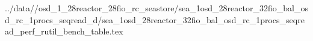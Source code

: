 ../data//osd_1_28reactor_28fio_rc_seastore/sea_1osd_28reactor_32fio_bal_osd_rc_1procs_seqread_d/sea_1osd_28reactor_32fio_bal_osd_rc_1procs_seqread_perf_rutil_bench_table.tex